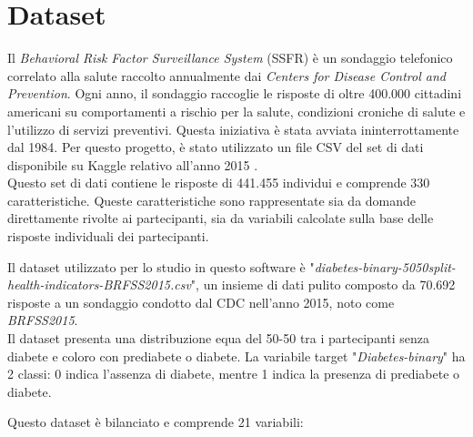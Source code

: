 \section[Dataset]{Dataset}
Il \textit{Behavioral Risk Factor Surveillance System} (SSFR) è un sondaggio telefonico correlato alla salute raccolto annualmente dai \textit{Centers for Disease Control and Prevention}.
Ogni anno, il sondaggio raccoglie le risposte di oltre 400.000 cittadini americani su comportamenti a rischio per la salute, condizioni croniche di salute e l'utilizzo di servizi preventivi.
Questa iniziativa è stata avviata ininterrottamente dal 1984.
Per questo progetto, è stato utilizzato un file CSV del set di dati disponibile su Kaggle relativo all'anno 2015 \cite{dataset}. \\
Questo set di dati contiene le risposte di 441.455 individui e comprende 330 caratteristiche.
Queste caratteristiche sono rappresentate sia da domande direttamente rivolte ai partecipanti, sia da variabili calcolate sulla base delle risposte individuali dei partecipanti.

Il dataset utilizzato per lo studio in questo software è "\textit{diabetes-binary-5050split-health-indicators-BRFSS2015.csv}", un insieme di dati pulito composto da 70.692 risposte a un sondaggio condotto dal CDC nell'anno 2015, noto come \textit{BRFSS2015}. \\
Il dataset presenta una distribuzione equa del 50-50 tra i partecipanti senza diabete e coloro con prediabete o diabete.
La variabile target "\textit{Diabetes-binary}" ha 2 classi: 0 indica l'assenza di diabete, mentre 1 indica la presenza di prediabete o diabete.

Questo dataset è bilanciato e comprende 21 variabili:

